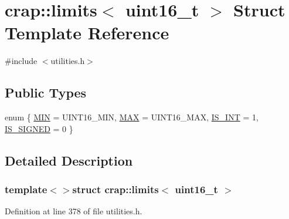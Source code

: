 \hypertarget{structcrap_1_1limits_3_01uint16__t_01_4}{}\section{crap\+:\+:limits$<$ uint16\+\_\+t $>$ Struct Template Reference}
\label{structcrap_1_1limits_3_01uint16__t_01_4}


{\ttfamily \#include $<$utilities.\+h$>$}

\subsection*{Public Types}
\begin{DoxyCompactItemize}
\item 
enum \{ \hyperlink{structcrap_1_1limits_3_01uint16__t_01_4_a61ad3be761298f3e005f7be8769a8533a2d5ba59562182999fa680807805f9b02}{M\+I\+N} = U\+I\+N\+T16\+\_\+\+M\+I\+N, 
\hyperlink{structcrap_1_1limits_3_01uint16__t_01_4_a61ad3be761298f3e005f7be8769a8533ace042d7de7c9dbe8c168a8aa6ed6dff8}{M\+A\+X} = U\+I\+N\+T16\+\_\+\+M\+A\+X, 
\hyperlink{structcrap_1_1limits_3_01uint16__t_01_4_a61ad3be761298f3e005f7be8769a8533ad2448a3c8dcbb917b93e0df0f48caa43}{I\+S\+\_\+\+I\+N\+T} = 1, 
\hyperlink{structcrap_1_1limits_3_01uint16__t_01_4_a61ad3be761298f3e005f7be8769a8533afa01cb0a38841bacb8f892fd5f82bf5b}{I\+S\+\_\+\+S\+I\+G\+N\+E\+D} = 0
 \}
\end{DoxyCompactItemize}


\subsection{Detailed Description}
\subsubsection*{template$<$$>$struct crap\+::limits$<$ uint16\+\_\+t $>$}



Definition at line 378 of file utilities.\+h.



